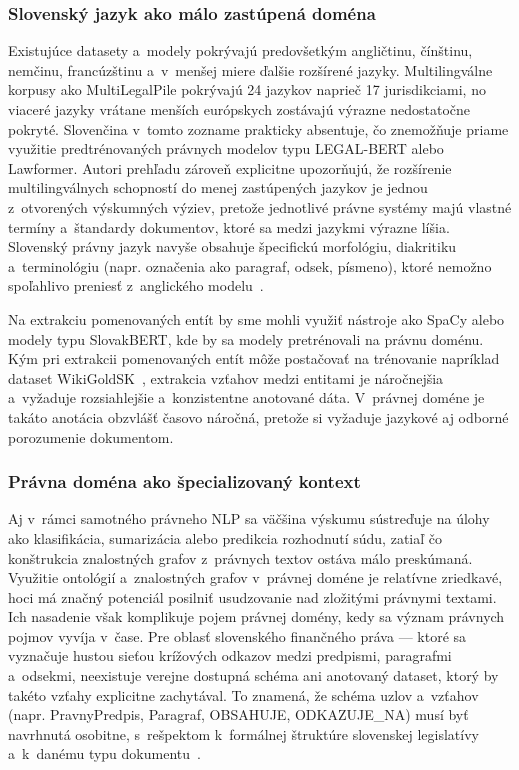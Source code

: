 \subsubsection{Slovenský jazyk ako málo zastúpená doména}
Existujúce datasety a~modely pokrývajú predovšetkým angličtinu, čínštinu, nemčinu, francúzštinu a~v~menšej miere ďalšie rozšírené jazyky. Multilingválne korpusy ako MultiLegalPile pokrývajú 24 jazykov naprieč 17 jurisdikciami, no viaceré jazyky vrátane menších európskych zostávajú výrazne nedostatočne pokryté. Slovenčina v~tomto zozname prakticky absentuje, čo znemožňuje priame využitie predtrénovaných právnych modelov typu LEGAL-BERT alebo Lawformer. Autori prehľadu zároveň explicitne upozorňujú, že rozšírenie multilingválnych schopností do menej zastúpených jazykov je jednou z~otvorených výskumných výziev, pretože jednotlivé právne systémy majú vlastné termíny a~štandardy dokumentov, ktoré sa medzi jazykmi výrazne líšia. Slovenský právny jazyk navyše obsahuje špecifickú morfológiu, diakritiku a~terminológiu (napr. označenia ako paragraf, odsek, písmeno), ktoré nemožno spoľahlivo preniesť z~anglického modelu~\cite{nlpLegal2025}.

Na extrakciu pomenovaných entít by sme mohli využiť nástroje ako SpaCy alebo modely typu SlovakBERT, kde by sa modely pretrénovali na právnu doménu. Kým pri extrakcii pomenovaných entít môže postačovať na trénovanie napríklad dataset WikiGoldSK~\cite{wikigoldsk2023}, extrakcia vzťahov medzi entitami je náročnejšia a~vyžaduje rozsiahlejšie a~konzistentne anotované dáta. V~právnej doméne je takáto anotácia obzvlášť časovo náročná, pretože si vyžaduje jazykové aj odborné porozumenie dokumentom.


\subsubsection{Právna doména ako špecializovaný kontext}
Aj v~rámci samotného právneho NLP sa väčšina výskumu sústreďuje na úlohy ako klasifikácia, sumarizácia alebo predikcia rozhodnutí súdu, zatiaľ čo konštrukcia znalostných grafov z~právnych textov ostáva málo preskúmaná. Využitie ontológií a~znalostných grafov v~právnej doméne je relatívne zriedkavé, hoci má značný potenciál posilniť usudzovanie nad zložitými právnymi textami. Ich nasadenie však komplikuje pojem právnej domény, kedy sa význam právnych pojmov vyvíja v~čase. Pre oblasť slovenského finančného práva — ktoré sa vyznačuje hustou sieťou krížových odkazov medzi predpismi, paragrafmi a~odsekmi, neexistuje verejne dostupná schéma ani anotovaný dataset, ktorý by takéto vzťahy explicitne zachytával. To znamená, že schéma uzlov a~vzťahov (napr. PravnyPredpis, Paragraf, OBSAHUJE, ODKAZUJE\_NA) musí byť navrhnutá osobitne, s~rešpektom k~formálnej štruktúre slovenskej legislatívy a~k~danému typu dokumentu~\cite{nlpLegal2025}.

